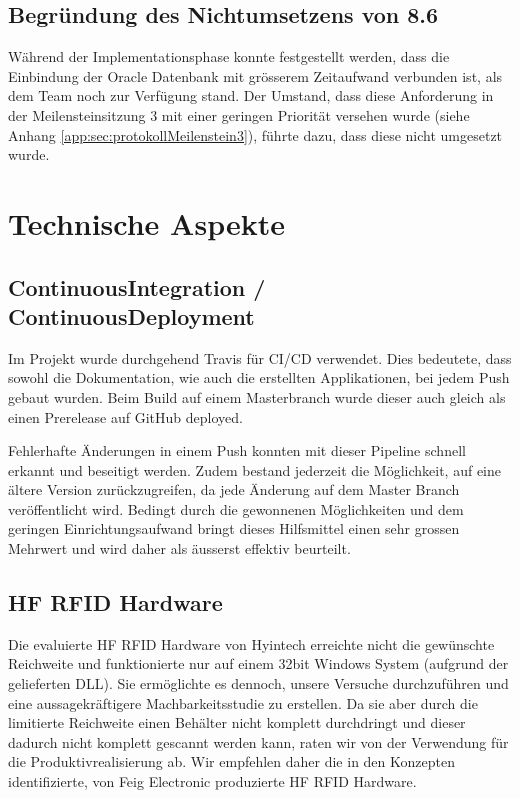 \subsection{Begründung des Nichtumsetzens von 8.6}
Während der Implementationsphase konnte festgestellt werden, dass die Einbindung der Oracle Datenbank mit grösserem Zeitaufwand verbunden ist, als dem Team noch zur Verfügung stand. Der Umstand, dass diese Anforderung in der Meilensteinsitzung 3 mit einer geringen Priorität versehen wurde (siehe Anhang \ref{app:sec:protokollMeilenstein3}), führte dazu, dass diese nicht umgesetzt wurde.

\section{Technische Aspekte}
\subsection{ContinuousIntegration / ContinuousDeployment}
Im Projekt wurde durchgehend Travis für CI/CD verwendet. Dies bedeutete, dass sowohl die Dokumentation, wie auch die erstellten Applikationen, bei jedem Push gebaut wurden. Beim Build auf einem Masterbranch wurde dieser auch gleich als einen Prerelease auf GitHub deployed.

Fehlerhafte Änderungen in einem Push konnten mit dieser Pipeline schnell erkannt und beseitigt werden. Zudem bestand jederzeit die Möglichkeit, auf eine ältere Version zurückzugreifen, da jede Änderung auf dem Master Branch veröffentlicht wird. Bedingt durch die gewonnenen Möglichkeiten und  dem geringen Einrichtungsaufwand bringt dieses Hilfsmittel einen sehr grossen Mehrwert und wird daher als äusserst effektiv beurteilt.

\subsection{HF RFID Hardware}
Die evaluierte \gls{HF} \gls{RFID} Hardware von Hyintech erreichte nicht die gewünschte Reichweite und funktionierte nur auf einem 32bit Windows System (aufgrund der gelieferten \gls{DLL}). Sie ermöglichte es dennoch, unsere Versuche durchzuführen und eine aussagekräftigere Machbarkeitsstudie zu erstellen. Da sie aber durch die limitierte Reichweite einen Behälter nicht komplett durchdringt und dieser dadurch nicht komplett gescannt werden kann, raten wir von der Verwendung für die Produktivrealisierung ab. Wir empfehlen daher die in den Konzepten identifizierte, von Feig Electronic produzierte \gls{HF} \gls{RFID} Hardware.

